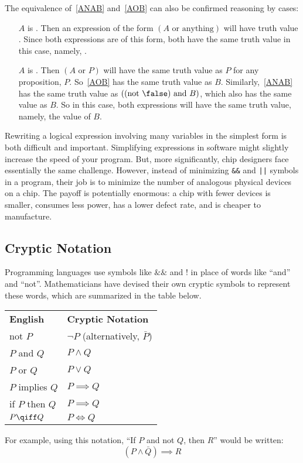 The equivalence of~\eqref{ANAB} and~\eqref{AOB} can also be confirmed
reasoning by cases:
\begin{itemize}
\item[$A$ is \true.]  Then an expression of the form $(A \text{ or }
  \text{anything})$ will have truth value \true.  Since both expressions
  are of this form, both have the same truth value in this case, namely,
  \true.

\item[$A$ is \false.]  Then $(A \text{ or } P)$ will have the same truth
  value as $P$ for any proposition, $P$.  So~\eqref{AOB} has the same
  truth value as $B$.  Similarly,~\eqref{ANAB} has the same truth value as
  $((\text{not } \false) \text{ and } B)$, which also has the same value
  as $B$.  So in this case, both expressions will have the same truth
  value, namely, the value of $B$.
\end{itemize}

Rewriting a logical expression involving many variables in the
simplest form is both difficult and important.  Simplifying
expressions in software might slightly increase the speed of your
program.  But, more significantly, chip designers face essentially the
same challenge.  However, instead of minimizing \texttt{\&\&} and
\texttt{||} symbols in a program, their job is to minimize the number
of analogous physical devices on a chip.  The payoff is potentially
enormous: a chip with fewer devices is smaller, consumes less power,
has a lower defect rate, and is cheaper to manufacture.

\subsection{Cryptic Notation}

Programming languages use symbols like $\&\&$ and $!$ in place of
words like ``and'' and ``not''.  Mathematicians have devised their own
cryptic symbols to represent these words, which are summarized in the
table below.
%
\begin{center}
\begin{tabular}{ll}
\textbf{English} & \textbf{Cryptic Notation} \\[1ex]
not $P$ & $\neg P$ \quad (alternatively, $\bar{P}$) \\
$P$ and $Q$ & $P \wedge Q$ \\
$P$ or $Q$ & $P \vee Q$ \\
$P$ implies $Q$ & $P \implies Q$ \\
if $P$ then $Q$ & $P \implies Q$ \\
$P \qiff Q$ & $P \iff Q$
\end{tabular}
\end{center}
%
For example, using this notation, ``If $P$ and not $Q$, then $R$''
would be written:
%
\[
(P \wedge \bar{Q}) \implies R
\]

